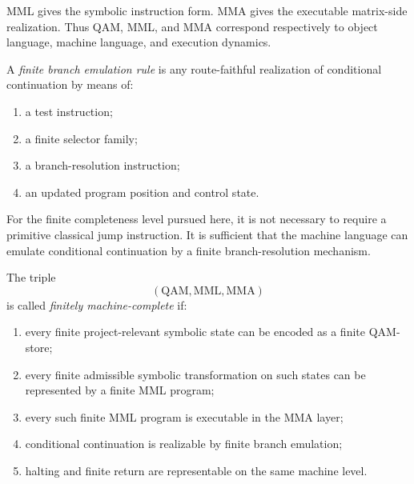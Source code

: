 \begin{remark}\label{rem:why-mma-is-the-right-execution-layer-computational-layer}
MML gives the symbolic instruction form. MMA gives the executable matrix-side realization. Thus QAM, MML, and MMA correspond respectively to object language, machine language, and execution dynamics.
\end{remark}

\begin{definition}\label{def:finite-branch-emulation-computational-layer}
A \emph{finite branch emulation rule} is any route-faithful realization of conditional continuation by means of:
\begin{enumerate}[leftmargin=2em]
    \item a test instruction;
    \item a finite selector family;
    \item a branch-resolution instruction;
    \item an updated program position and control state.
\end{enumerate}
\end{definition}

\begin{remark}\label{rem:why-explicit-jump-is-not-required-computational-layer}
For the finite completeness level pursued here, it is not necessary to require a primitive classical jump instruction. It is sufficient that the machine language can emulate conditional continuation by a finite branch-resolution mechanism.
\end{remark}

\begin{definition}\label{def:finite-machine-completeness-computational-layer}
The triple
\[
(\mathrm{QAM},\mathrm{MML},\mathrm{MMA})
\]
is called \emph{finitely machine-complete} if:
\begin{enumerate}[leftmargin=2em]
    \item every finite project-relevant symbolic state can be encoded as a finite QAM-store;
    \item every finite admissible symbolic transformation on such states can be represented by a finite MML program;
    \item every such finite MML program is executable in the MMA layer;
    \item conditional continuation is realizable by finite branch emulation;
    \item halting and finite return are representable on the same machine level.
\end{enumerate}
\end{definition}

